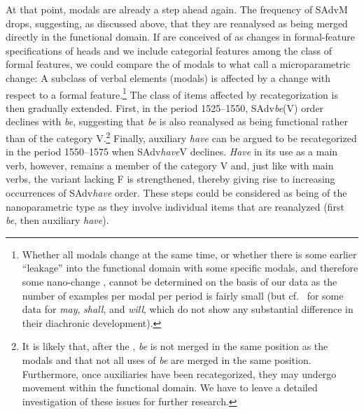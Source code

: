\documentclass[output=paper]{langsci/langscibook}
\begin{document}
\largerpage[-2]
At that point, modals are already a step ahead again. The frequency of SAdvM
drops, suggesting, as discussed above, that they are reanalysed as being merged
directly in the functional domain. If  are conceived of as changes in
formal-feature specifications of heads and we include categorial features among
the class of formal features, we could compare the  of modals to what
\textcite{BibRob2012b,BibRob2016} call a microparametric change: A subclass of
verbal elements (modals) is affected by a change with respect to a formal
feature.\footnote{Whether all modals change at the same time, or whether there
    is some earlier “leakage” into the functional domain with some specific
    modals, and therefore some nano-change \parencite[cf.][43]{RobRou2003},
    cannot be determined on the basis of our data as the number of examples per
    modal per period is fairly small (but cf.\ \citealt{HaeIhsta}
    for some data for \emph{may}, \emph{shall}, and \emph{will}, which do not
show any substantial difference in their diachronic development).} The class of
items affected by recategorization is then gradually extended.  First, in the
period 1525--1550, SAdv\emph{be}(V) order declines with \emph{be}, suggesting
that \emph{be} is also reanalysed as being functional rather than of the
category V.\footnote{It is likely that, after the , \emph{be} is not
    merged in the same position as the modals and that not all uses of
\emph{be} are merged in the same position.  Furthermore, once auxiliaries have
been recategorized, they may undergo movement within the functional domain. We
have to leave a detailed investigation of these issues for further research.}
Finally, auxiliary \emph{have} can be argued to be recategorized in the period
1550--1575 when SAdv\emph{have}V declines. \emph{Have} in its use as a main
verb, however, remains a member of the category V and, just like with main
verbs, the variant lacking F is strengthened, thereby giving rise to increasing
occurrences of SAdv\emph{have} order. These steps could be considered as being
of the nanoparametric type as they involve individual items that are reanalyzed
(first \emph{be}, then auxiliary \emph{have}).
\end{document}
